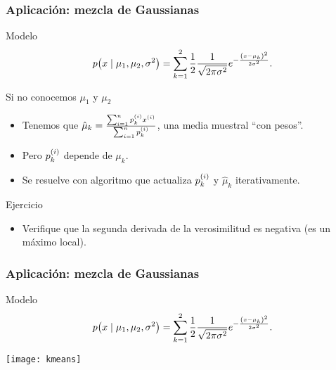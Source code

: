 \documentclass[table]{beamer}
\begin{document}
\begin{frame}
    \frametitle{Aplicación: mezcla de Gaussianas}
    \begin{exampleblock}{Modelo}
        \begin{equation*}
            \pdf{x \mid \mu_{1} , \mu_{2} , \sigma^{2}} = \sum_{k = 1}^{2} \frac{1}{2} \frac{1}{\sqrt{2 \pi \sigma^{2}}} e^{- \frac{\parens{x - \mu_{k}}^{2}}{2 \sigma^{2}}} .
        \end{equation*}
    \end{exampleblock}
    \begin{block}{Si no conocemos $\mu_{1}$ y $\mu_{2}$}
        \begin{itemize}
            \item Tenemos que $\hat{\mu}_{k} = \frac{\sum_{i = 1}^{n} p^{\parens{i}}_{k} x^{\parens{i}}}{\sum_{i = 1}^{n} p^{\parens{i}}_{k}}$, una media muestral ``con pesos''.
            \item Pero $p^{\parens{i}}_{k}$ depende de $\mu_{k}$.
            \item Se resuelve con algoritmo que actualiza $p^{\parens{i}}_{k}$ y $\hat{\mu}_{k}$ iterativamente.
        \end{itemize}
    \end{block}
    \begin{block}{Ejercicio}
        \begin{itemize}
            \item Verifique que la segunda derivada de la verosimilitud es negativa (es un máximo local).
        \end{itemize}
    \end{block}
\end{frame}

\begin{frame}
    \frametitle{Aplicación: mezcla de Gaussianas}
    \begin{exampleblock}{Modelo}
        \begin{equation*}
            \pdf{x \mid \mu_{1} , \mu_{2} , \sigma^{2}} = \sum_{k = 1}^{2} \frac{1}{2} \frac{1}{\sqrt{2 \pi \sigma^{2}}} e^{- \frac{\parens{x - \mu_{k}}^{2}}{2 \sigma^{2}}} .
        \end{equation*}
    \end{exampleblock}
    \begin{center}
        \texttt{[image: kmeans]}
    \end{center}
\end{frame}
\end{document}
